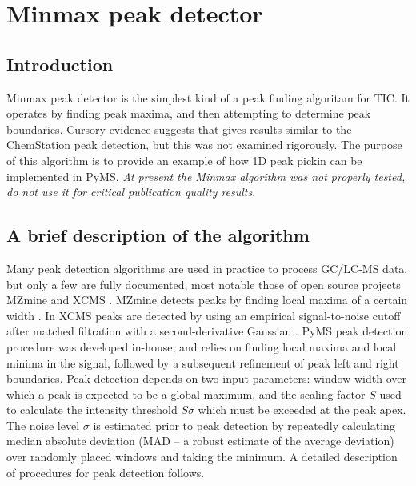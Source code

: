 
\section{Minmax peak detector}

\subsection{Introduction}

Minmax peak detector is the simplest kind of a peak finding algoritam for
TIC. It operates by finding peak maxima, and then attempting to determine
peak boundaries. Cursory evidence suggests that gives results similar to
the ChemStation peak detection, but this was not examined rigorously.
The purpose of this algorithm is to provide an example of how 1D peak
pickin can be implemented in PyMS. {\em At present the Minmax algorithm
was not properly tested, do not use it for critical publication quality
results}.

\subsection{A brief description of the algorithm}

Many peak detection algorithms are used in practice to process GC/LC-MS data,
but only a few are fully documented, most notable those of open source
projects MZmine \cite{katajamaa06} and XCMS \cite{smith06}.  MZmine detects
peaks by finding local maxima of a certain width \cite{katajamaa06}. In XCMS
peaks are detected by using an empirical signal-to-noise cutoff after matched
filtration with a second-derivative Gaussian \cite{smith06}. PyMS peak
detection procedure was developed in-house, and relies on finding local
maxima and local minima in the signal, followed by a subsequent refinement
of peak left and right boundaries. Peak detection depends on two input
parameters: window width over which a peak is expected to be a global maximum,
and the scaling factor $S$ used to calculate the intensity threshold $S
\sigma$ which must be exceeded at the peak apex. The noise level $\sigma$
is estimated prior to peak detection by repeatedly calculating median
absolute deviation (MAD -- a robust estimate of the average deviation) over
randomly placed windows and taking the minimum. A detailed description of
procedures for peak detection follows. 

